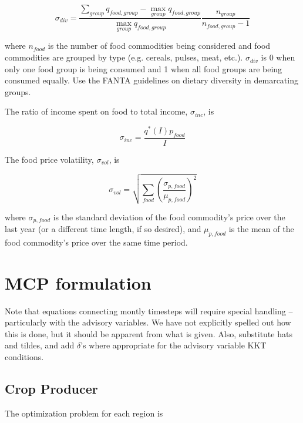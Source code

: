 \documentclass[letter,12pt]{article}
\begin{document}
\begin{equation}
\sigma_{div} = \frac{\sum \limits_{group} q_{food,group} - \max \limits_{group} q_{food,group}}{\max \limits_{group} q_{food,group}} \frac{n_{group}}{n_{food,group} - 1}
\end{equation}

\noindent where $n_{food}$ is the number of food commodities being considered and food commodities are grouped by type (e.g. cereals, pulses, meat, etc.).  $\sigma_{div}$ is 0 when only one food group is being consumed and 1 when all food groups are being consumed equally.  Use the FANTA guidelines on dietary diversity in demarcating groups.

The ratio of income spent on food to total income, $\sigma_{inc}$, is

\begin{equation}
\sigma_{inc} = \frac{q^*\left(I\right) p_{food}}{I} 
\end{equation}

The food price volatility, $\sigma_{vol}$, is

\begin{equation}
\sigma_{vol} = \sqrt{\sum_{food} \left(\frac{\sigma_{p,food}}{\mu_{p,food}}\right)^2}
\end{equation}

\noindent where $\sigma_{p,food}$ is the standard deviation of the food commodity's price over the last year (or a different time length, if so desired), and $\mu_{p,food}$ is the mean of the food commodity's price over the same time period.


\section{MCP formulation}

Note that equations connecting montly timesteps will require special handling -- particularly with the advisory variables.  We have not explicitly spelled out how this is done, but it should be apparent from what is given.  Also, substitute hats and tildes, and add $\delta$'s where appropriate for the advisory variable KKT conditions.

\subsection{Crop Producer}

The optimization problem for each region is
\end{document}
